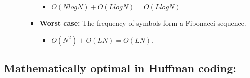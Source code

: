 \begin{enumerate}[label=\textbf{\Alph*.}]
\begin{itemize}
\begin{itemize}
                \begin{itemize}
                    \item $O(NlogN)  + O(LlogN) = O(LlogN)$
                \end{itemize}
                \item \textbf{Worst case:} The frequency of symbols form a Fibonacci sequence.
                \begin{itemize}
                    \item $O(N^2) + O(LN) = O(LN)$.
                \end{itemize}
            \end{itemize}
        \end{itemize}
    \end{enumerate}
\subsection{Mathematically optimal in Huffman coding:}
